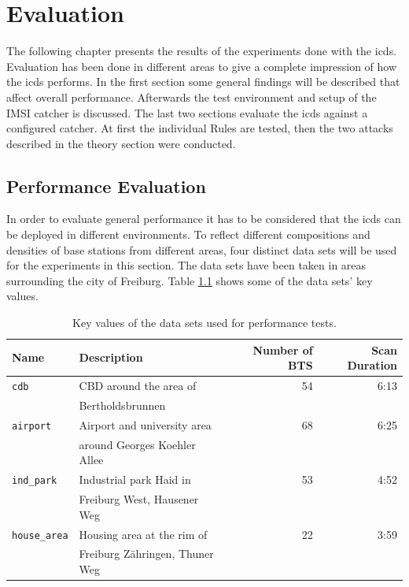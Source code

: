 \chapter{Evaluation}
The following chapter presents the results of the experiments done with the \gls{icds}.
Evaluation has been done in different areas to give a complete impression of how the \gls{icds} performs.
In the first section some general findings will be described that affect overall performance.
Afterwards the test environment and setup of the IMSI catcher is discussed.
The last two sections evaluate the \gls{icds} against a configured catcher.
At first the individual Rules are tested, then the two attacks described in the theory section were conducted.

\section{Performance Evaluation}
In order to evaluate general performance it has to be considered that the \gls{icds} can be deployed in different environments.
To reflect different compositions and densities of base stations from different areas, four distinct data sets will be used for the experiments in this section.
The data sets have been taken in areas surrounding the city of Freiburg.
Table \ref{tab:key_data} shows some of the data sets' key values.
\begin{table}
\centering
\begin{tabular}{llrr}
\toprule
Name					&Description					&Number of BTS	&Scan Duration\\
\midrule
\texttt{cdb}			&CBD around the area of			&54				&6:13		\\
						&Bertholdsbrunnen				&				&			\\
\texttt{airport}		&Airport and university area	&68				&6:25		\\
						&around Georges Koehler Allee	&				&			\\
\texttt{ind\_park}		&Industrial park Haid in 		&53				&4:52		\\
						&Freiburg West,  Hausener Weg	&				&			\\
\texttt{house\_area}	&Housing area at the rim of 	&22				&3:59		\\
						&Freiburg Zähringen, Thuner Weg	&				&			\\
\bottomrule
\end{tabular}
\caption{Key values of the data sets used for performance tests.}
\label{tab:key_data}
\end{table}

